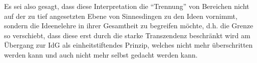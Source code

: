 


Es sei also gesagt, dass diese Interpretation die \enquote{Trennung} von Bereichen nicht auf der zu tief angesetzten Ebene von Sinnesdingen zu den Ideen vornimmt, sondern die Ideenelehre in ihrer Gesamtheit zu begreifen möchte, d.h. die Grenze so verschiebt, dass diese erst durch die starke Transzendenz beschränkt wird am Übergang zur IdG als einheitstiftendes Prinzip, welches nicht mehr überschritten werden kann und auch nicht mehr selbst gedacht werden kann.


